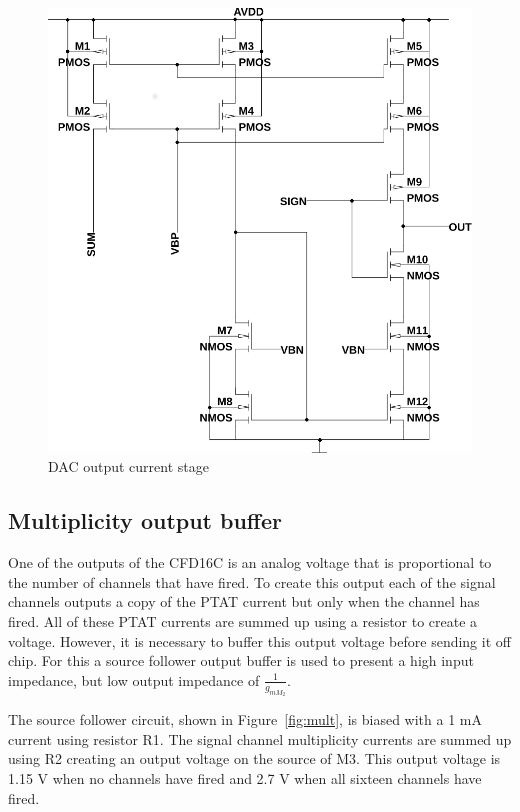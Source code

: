 \documentclass[12pt,oneside,final]{siuethesis}
\theoremstyle{definition}
\begin{document}
\begin{figure}[htbp!]
\centering
\includegraphics[scale=.6,keepaspectratio=true]{../LTspice_Drawings/dac/dac_out.png} 
\caption{DAC output current stage}
\label{fig:dac-out}
\end{figure}

\subsection{Multiplicity output buffer}
\par One of the outputs of the CFD16C is an analog voltage that is proportional to the number of channels that have fired. To create this output each of the signal channels outputs a copy of the PTAT current but only when the channel has fired. All of these PTAT currents are summed up using a resistor to create a voltage. However, it is necessary to buffer this output voltage before sending it off chip. For this a source follower output buffer is used to present a high input impedance, but low output impedance of $\frac{1}{g_{m M_{2}}}$. 
\par The source follower circuit, shown in Figure~\ref{fig:mult}, is biased with a 1 mA current using resistor R1. The signal channel multiplicity currents are summed up using R2 creating an output voltage on the source of M3. This output voltage is 1.15 V when no channels have fired and 2.7 V when all sixteen channels have fired. 
\end{document}
